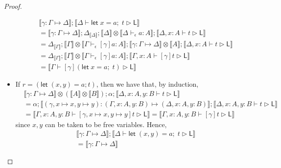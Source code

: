 \documentclass[acmsmall,screen,review]{acmart}
\newcommand{\ms}[1]{\ensuremath{\mathsf{#1}}}
\newcommand{\letexpr}[3]{\ensuremath{\ms{let}\;#1 = #2;\;#3}}
\newcommand{\letstmt}[3]{\ensuremath{\ms{let}\;#1 = #2; #3}}
\newcommand{\bhyp}[2]{#1 : #2}
\newcommand{\hasty}[4]{#1 \vdash_{#2} #3: {#4}}
\newcommand{\haslb}[3]{#1 \vdash #2 \rhd #3}
\newcommand{\issubst}[3]{#1: #2 \mapsto #3}
\newcommand{\dnt}[1]{\llbracket{#1}\rrbracket}
\begin{document}
\begin{proof}
\begin{itemize}[leftmargin=*]
    \begin{equation}
      \begin{aligned}
        & \dnt{\issubst{\gamma}{\Gamma}{\Delta}} 
        ; \dnt{\haslb{\Delta}{\letexpr{x}{a}{t}}{\ms{L}}} \\
        &= \dnt{\issubst{\gamma}{\Gamma}{\Delta}}
        ; \Delta_{\dnt{\Delta}} ; \dnt{\Delta} \otimes \dnt{\hasty{\Delta}{\epsilon}{a}{A}}
        ; \dnt{\haslb{\Delta, \bhyp{x}{A}}{t}{\ms{L}}} \\
        &= \Delta_{\dnt{\Gamma}} 
        ; \dnt{\Gamma} 
          \otimes \dnt{\hasty{\Gamma}{\epsilon}{[\gamma]a}{A}}
        ; \dnt{\issubst{\gamma}{\Gamma}{\Delta}} \otimes \dnt{A}
        ; \dnt{\haslb{\Delta, \bhyp{x}{A}}{t}{\ms{L}}} \\
        &= \Delta_{\dnt{\Gamma}}
        ; \dnt{\Gamma} \otimes \dnt{\hasty{\Gamma}{\epsilon}{[\gamma]a}{A}}
        ; \dnt{\haslb{\Gamma, \bhyp{x}{A}}{[\gamma]t}{\ms{L}}} \\
        &= \dnt{\haslb{\Gamma}{[\gamma](\letexpr{x}{a}{t})}{\ms{L}}}
      \end{aligned}
    \end{equation}
    \item If $r = (\letstmt{(x, y)}{a}{t})$, then we have that, by induction,
    \begin{equation}
      \begin{aligned}
      & \dnt{\issubst{\gamma}{\Gamma}{\Delta}} \otimes (\dnt{A} \otimes \dnt{B}) 
          ; \alpha ; \dnt{\haslb{\Delta, \bhyp{x}{A}, \bhyp{y}{B}}{t}{\ms{L}}}
      \\ &= \alpha ; \dnt{\issubst{(\gamma, x \mapsto x, y \mapsto y)}
        {(\Gamma, \bhyp{x}{A}, \bhyp{y}{B})}{(\Delta, \bhyp{x}{A}, \bhyp{y}{B})}}
          ; \dnt{\haslb{\Delta, \bhyp{x}{A}, \bhyp{y}{B}}{t}{\ms{L}}}
      \\ &= \dnt{\haslb{\Gamma, \bhyp{x}{A}, \bhyp{y}{B}}
                        {[\gamma, x \mapsto x, y \mapsto y]t}{\ms{L}}}
          = \dnt{\haslb{\Gamma, \bhyp{x}{A}, \bhyp{y}{B}}{[\gamma]t}{\ms{L}}}
      \end{aligned}
    \end{equation}
    since $x, y$ can be taken to be free variables. Hence,
    \begin{equation}
      \begin{aligned}
        & \dnt{\issubst{\gamma}{\Gamma}{\Delta}} 
        ; \dnt{\haslb{\Delta}{\letexpr{(x, y)}{a}{t}}{\ms{L}}} \\
        &= \dnt{\issubst{\gamma}{\Gamma}{\Delta}}

\end{aligned}
\end{equation}
\end{itemize}
\end{proof}
\end{document}
